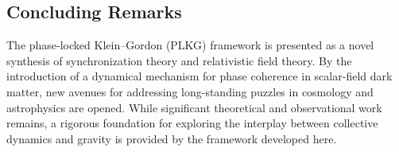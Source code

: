 \subsection{Concluding Remarks}
\label{subsec:concluding-remarks}
The phase-locked Klein--Gordon (PLKG) framework is presented as a novel synthesis of synchronization theory and relativistic field theory. By the introduction of a dynamical mechanism for phase coherence in scalar-field dark matter, new avenues for addressing long-standing puzzles in cosmology and astrophysics are opened. While significant theoretical and observational work remains, a rigorous foundation for exploring the interplay between collective dynamics and gravity is provided by the framework developed here.
